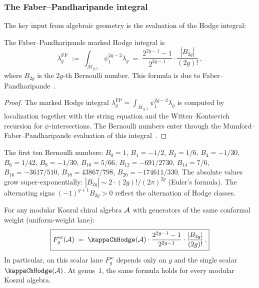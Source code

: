 \subsubsection{The Faber--Pandharipande integral}

The key input from algebraic geometry is the evaluation of the Hodge integral:

\begin{proposition}
\label{prop:thqg-I-faber-pandharipande}
The Faber--Pandharipande marked Hodge integral is
\begin{equation}%
\lambda_g^{\mathrm{FP}} \;:=\; \int_{\overline{\mathcal{M}}_{g,1}}\psi_1^{2g-2}\lambda_g \;=\; \frac{2^{2g-1} - 1}{2^{2g-1}} \cdot \frac{|B_{2g}|}{(2g)!}\,,
\end{equation}
where $B_{2g}$ is the $2g$-th Bernoulli number. This formula is due to Faber--Pandharipande~\cite{FP00}.
\end{proposition}

\begin{proof}
The marked Hodge integral
$\lambda_g^{\mathrm{FP}}
=\int_{\overline{\mathcal{M}}_{g,1}}\psi_1^{2g-2}\lambda_g$
is computed by localization together with the string equation and
the Witten--Kontsevich recursion for $\psi$-intersections. The
Bernoulli numbers enter through the Mumford--Faber--Pandharipande
evaluation of this integral~\cite{FP00}.
\end{proof}

\begin{remark}
The first ten Bernoulli numbers: $B_0 = 1$, $B_1 = -1/2$, $B_2 = 1/6$, $B_4 = -1/30$, $B_6 = 1/42$, $B_8 = -1/30$, $B_{10} = 5/66$, $B_{12} = -691/2730$, $B_{14} = 7/6$, $B_{16} = -3617/510$, $B_{18} = 43867/798$, $B_{20} = -174611/330$. The absolute values grow super-exponentially: $|B_{2g}| \sim 2 \cdot (2g)! / (2\pi)^{2g}$ (Euler's formula). The alternating signs $(-1)^{g+1} B_{2g} > 0$ reflect the alternation of Hodge classes.
\end{remark}

\begin{proposition}
\label{prop:thqg-I-Fg-closed-form}
For any modular Koszul chiral algebra $\mathcal{A}$ with
generators of the same conformal weight (uniform-weight lane):
\begin{equation}%
\boxed{ F_g^{\mathrm{sc}}(\cA) \;=\; \kappaChHodge(\cA) \cdot \frac{2^{2g-1}-1}{2^{2g-1}} \cdot \frac{|B_{2g}|}{(2g)!}\,. }
\end{equation}
In particular, on this scalar lane $F_g^{\mathrm{sc}}$ depends only on $g$
and the single scalar $\kappaChHodge(\cA)$. At genus~$1$, the same formula
holds for every modular Koszul algebra.
\end{proposition}

